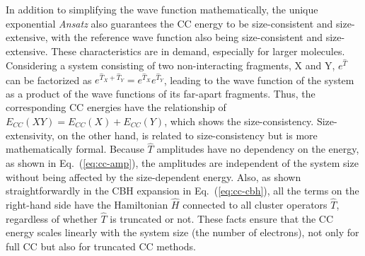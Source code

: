 In addition to simplifying the wave function mathematically, the unique exponential \textit{Ansatz} also guarantees the CC energy to be size-consistent and size-extensive,\cite{Sinanoglu1964, Cizek1966, Cizek1971, Crawford2000} with the reference wave function also being size-consistent and size-extensive. These characteristics are in demand, especially for larger molecules. Considering a system consisting of two non-interacting fragments, X and Y, $e^{\hat{T}}$ can be factorized as $e^{\hat{T}_{X}+\hat{T}_{Y}}=e^{\hat{T}_{X}}e^{\hat{T}_{Y}}$, leading to the wave function of the system as a product of the wave functions of its far-apart fragments. Thus, the corresponding CC energies have the relationship of $E_{CC}(XY) = E_{CC}(X) + E_{CC}(Y)$, which shows the size-consistency. Size-extensivity, on the other hand, is related to size-consistency but is more mathematically formal. Because $\hat{T}$ amplitudes have no dependency on the energy, as shown in Eq.~(\ref{eq:cc-amp}), the amplitudes are independent of the system size without being affected by the size-dependent energy. Also, as shown straightforwardly in the CBH expansion in Eq.~(\ref{eq:cc-cbh}), all the terms on the right-hand side have the Hamiltonian $\hat{H}$ connected to all cluster operators $\hat{T}$, regardless of whether $\hat{T}$ is truncated or not. These facts ensure that the CC energy scales linearly with the system size (the number of electrons), not only for full CC but also for truncated CC methods.

